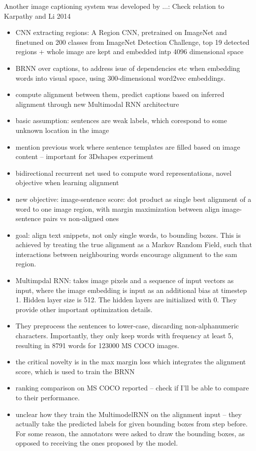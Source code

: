 Another image captioning system was developed by \cite{karpathy2015deep}...: Check relation to Karpathy and Li 2014
\begin{itemize}
	\item CNN extracting regions: A Region CNN, pretrained on ImageNet and finetuned on 200 classes from ImageNet Detection Challenge, top 19 detected regions + whole image are kept and embedded intp 4096 dimensional space
	\item BRNN over captions, to address isue of dependencies etc when embedding words into visual space, using 300-dimensional word2vec embeddings. 
	\item compute alignment between them, predict captions based on inferred alignment through new Multimodal RNN architecture
	\item basic assumption: sentences are weak labels, which corespond to some unknown location in the image
	\item mention previous work where sentence templates are filled based on image content -- important for 3Dshapes experiment
	\item bidirectional recurrent net used to compute word representations, novel objective when learning alignment
	\item new objective: image-sentence score: dot product as single best alignment of a word to one image region, with margin maximization between align image-sentence pairs vs non-aligned ones
	\item goal: align text snippets, not only single words, to bounding boxes. This is achieved by treating the true alignment as a Markov Random Field, such that interactions between neighbouring words encourage alignment to the sam region.
	\item Multimpdal RNN: takes image pixels and a sequence of input vectors as input, where the image embedding is input as an additional bias at timestep 1. Hidden layer size is 512. The hidden layers are initialized with 0. They provide other important optimization details.
	\item They preprocess the sentences to lower-case, discarding non-alphanumeric characters. Importantly, they only keep words with frequency at least 5, resulting in 8791 words for 123000 MS COCO images. 
	\item the critical novelty is in the max margin loss which integrates the alignment score, which is used to train the BRNN
	\item ranking comparison on MS COCO reported -- check if I'll be able to compare to their performance.
	\item unclear how they train the MultimodelRNN on the alignment input -- they actually take the predicted labels for given bounding boxes from step before. For some reason, the annotators were asked to draw the bounding boxes, as opposed to receiving the ones proposed by the model.
\end{itemize}

